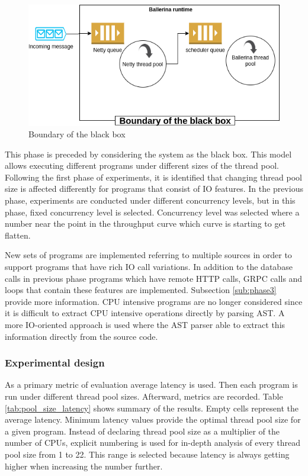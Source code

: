 \begin{figure}[htbp]
	\begin{center}
		\includegraphics[scale=0.5]{figures/black_box_boundary.png}
	\end{center}
	\caption{Boundary of the black box}
	\label{black_box_boundary}
\end{figure}


This phase is preceded by considering the system as the black box. This model allows executing different programs under different sizes of the thread pool. Following the first phase of experiments, it is identified that changing thread pool size is affected differently for programs that consist of IO features. In the previous phase, experiments are conducted under different concurrency levels, but in this phase, fixed concurrency level is selected. Concurrency level was selected where a number near the point in the throughput curve which curve is starting to get flatten.

New sets of programs are implemented referring to multiple sources \cite{Ballerina_Performance,Ballerina_Website} in order to support programs that have rich IO call variations. In addition to the database calls in previous phase programs which have remote HTTP calls, GRPC calls and loops that contain these features are implemented. Subsection \ref{sub:phase3} provide more information. CPU intensive programs are no longer considered since it is difficult to extract CPU intensive operations directly by parsing AST. A more IO-oriented approach is used where the AST parser able to extract this information directly from the source code.  
	
\subsubsection{Experimental design} 

As a primary metric of evaluation average latency is used. Then each program is run under different thread pool sizes. Afterward, metrics are recorded. Table \ref{tab:pool_size_latency} shows summary of the results. Empty cells represent the average latency. Minimum latency values provide the optimal thread pool size for a given program. Instead of declaring thread pool size as a multiplier of the number of CPUs, explicit numbering is used for in-depth analysis of every thread pool size from 1 to 22. This range is selected because latency is always getting higher when increasing the number further.    

